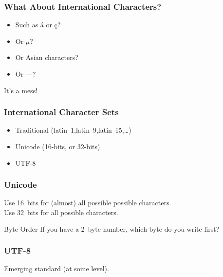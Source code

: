 \begin{frame}[fragile]
\frametitle{What About International Characters?}

\begin{itemize}
\item Such as \'{a} or \c{c}?
\item Or $\mu$?
\item Or Asian characters?
\item Or ---?

\end{itemize}
It's a mess!
\end{frame}

\begin{frame}[fragile]
\frametitle{International Character Sets}

\begin{itemize}
\item Traditional (latin--1,latin--9,latin--15,\ldots)
\item Unicode (16-bits, or 32-bits)
\item UTF-8
\end{itemize}
\end{frame}

\begin{frame}[fragile]
\frametitle{Unicode}

Use 16~bits for (almost) all possible possible characters.\\
Use 32~bits for all possible characters.

\begin{block}{Byte Order}
If you have a 2~byte number, which byte do you write first?
\end{block}

\end{frame}

\begin{frame}[fragile]
\frametitle{UTF-8}
Emerging standard (at some level).
\end{frame}


